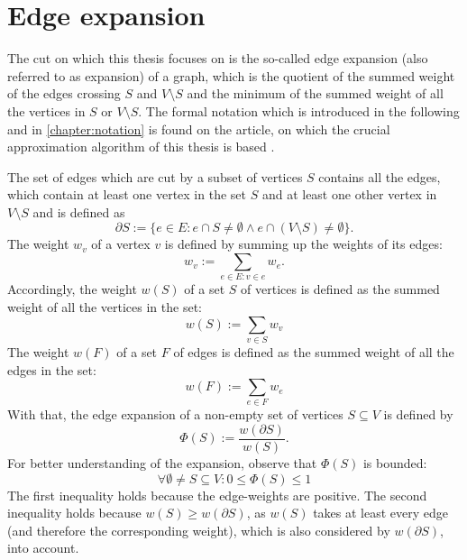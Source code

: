 \section{Edge expansion}
The cut on which this thesis focuses on is the so-called edge expansion (also referred to as expansion) of a graph, which is the quotient of the summed weight of the edges crossing $S$ and $V\setminus S$ and the minimum of the summed weight of all the vertices in $S$ or $V\setminus S$. The formal notation which is introduced in the following and in \cref{chapter:notation} is found on the article, on which the crucial approximation algorithm of this thesis is based \cite{ChanLTZ16}.

The set of edges which are cut by a subset of vertices $S$ contains all the edges, which contain at least one vertex in the set $S$ and at least one other vertex in $V\setminus S$ and is defined as \begin{equation}
\partial S:= \{e\in E : e \cap S \neq \emptyset \land  e \cap (V \setminus S) \neq \emptyset  \}.
\end{equation} 
The weight $w_v$ of a vertex $v$ is defined by summing up the weights of its edges: \begin{equation}
w_v := \sum_{e\in E: v\in e} w_e.
\end{equation} %
Accordingly, the weight $w(S)$ of a set $S$ of vertices is defined as the summed weight of all the vertices in the set: 
\begin{equation}
	w(S) := \sum_{v\in S} w_v
\end{equation}
The weight $w(F)$ of a set $F$ of edges is defined as the summed weight of all the edges in the set: 
\begin{equation}
w(F) := \sum_{e\in F} w_e
\end{equation}
With that, the edge expansion of a non-empty set of vertices $S \subseteq V$ is defined by \begin{equation}
\Phi(S):= \frac{w(\partial S)}{w(S)}.
\end{equation}
For better understanding of the expansion, observe that $\Phi(S)$ is bounded: \begin{equation} \label{eq:phi_bounded}
\forall \emptyset \neq S \subseteq V : 0\le \Phi(S) \le 1 
\end{equation} The first inequality holds because the edge-weights are positive. The second inequality holds because $w(S) \ge w(\partial S)$, as $w(S)$ takes at least every edge (and therefore the corresponding weight), which is also considered by $w(\partial S)$, into account.


